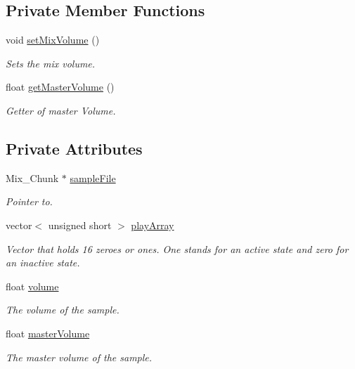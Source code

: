 \subsection*{Private Member Functions}
\begin{DoxyCompactItemize}
\item 
void \hyperlink{class_sample_a6d13988721d2190947f65969d4737a48}{set\+Mix\+Volume} ()
\begin{DoxyCompactList}\small\item\em Sets the mix volume. \end{DoxyCompactList}\item 
float \hyperlink{class_sample_afceddb412ab50a67cb98ca6b72456f24}{get\+Master\+Volume} ()
\begin{DoxyCompactList}\small\item\em Getter of master Volume. \end{DoxyCompactList}\end{DoxyCompactItemize}
\subsection*{Private Attributes}
\begin{DoxyCompactItemize}
\item 
Mix\+\_\+\+Chunk $\ast$ \hyperlink{class_sample_ae158342c8d18a05de1c85802f7cfbd2a}{sample\+File}
\begin{DoxyCompactList}\small\item\em Pointer to. \end{DoxyCompactList}\item 
vector$<$ unsigned short $>$ \hyperlink{class_sample_a824014df7294cb94445e7ee89cc15987}{play\+Array}
\begin{DoxyCompactList}\small\item\em Vector that holds 16 zeroes or ones. One stands for an active state and zero for an inactive state. \end{DoxyCompactList}\item 
float \hyperlink{class_sample_a74a4b4799b2bdec9fdde363992b9cec8}{volume}
\begin{DoxyCompactList}\small\item\em The volume of the sample. \end{DoxyCompactList}\item 
float \hyperlink{class_sample_a2d48ff8caf8425c37cf74130afb0c87a}{master\+Volume}
\begin{DoxyCompactList}\small\item\em The master volume of the sample. \end{DoxyCompactList}\end{DoxyCompactItemize}


